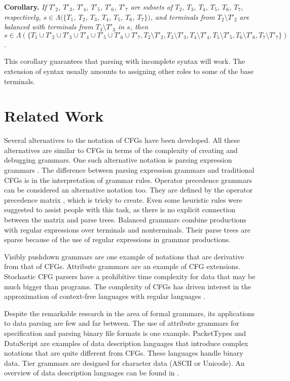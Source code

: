 \documentclass{llncs}
\begin{document}
\textbf{Corollary.} \textit{If $T'_2$, $T'_3$, $T'_4$, $T'_5$, $T'_6$, $T'_7$ are subsets of $T_2$, $T_3$, $T_4$, $T_5$, $T_6$, $T_7$, respectively, $s \in \Lambda(\{T_1$, $T_2$, $T_3$, $T_4$, $T_5$, $T_6$, $T_7\})$, and terminals from $T_2 \setminus T'_2$ are balanced with terminals from $T_3 \setminus T'_3$ in $s$, then $s \in \Lambda(\{T_1 \cup T'_2 \cup T'_3 \cup T'_4 \cup T'_5 \cup T'_6 \cup T'_7, T_2 \setminus T'_2, T_3 \setminus T'_3, T_4 \setminus T'_4, T_5 \setminus T'_5, T_6 \setminus T'_6, T_7 \setminus T'_7\})$.}

This corollary guarantees that parsing with incomplete syntax will work. The extension of syntax usually amounts to assigning other roles to some of the base terminals.

\section{Related Work}

Several alternatives to the notation of CFGs have been developed. All these alternatives are similar to CFGs in terms of the complexity of creating and debugging grammars. One such alternative notation is parsing expression grammars \cite{Ford04}. The difference between parsing expression grammars and traditional CFGs is in the interpretation of grammar rules.  Operator precedence grammars can be considered an alternative notation too. They are defined by the operator precedence matrix \cite{Meduna07}, which is tricky to create. Even some heuristic rules were suggested to assist people with this task, as there is no explicit connection between the matrix and parse trees. Balanced grammars \cite{Berstel02} combine productions with regular expressions over terminals and nonterminals. Their parse trees are sparse because of the use of regular expressions in grammar productions. 

Visibly pushdown grammars \cite{Alur04} are one example of notations that are derivative from that of CFGs. Attribute grammars \cite{Aho06} are an example of CFG extensions. Stochastic CFG parsers \cite{Chappelier98} have a prohibitive time complexity for data that may be much bigger than programs. The complexity of CFGs has driven interest in the approximation of context-free languages with regular languages \cite{Egecioglu09}. 

Despite the remarkable research in the area of formal grammars, its applications to data parsing are few and far between. The use of attribute grammars for specification and parsing binary file formats \cite{Underwood12} is one example. PacketTypes \cite{McCann00} and DataScript \cite{Back02} are examples of data description languages that introduce complex notations that are quite different from CFGs. These languages handle binary data. Tier grammars are designed for character data (ASCII or Unicode). An overview of data description languages can be found in \cite{Fisher06}. 
\end{document}
